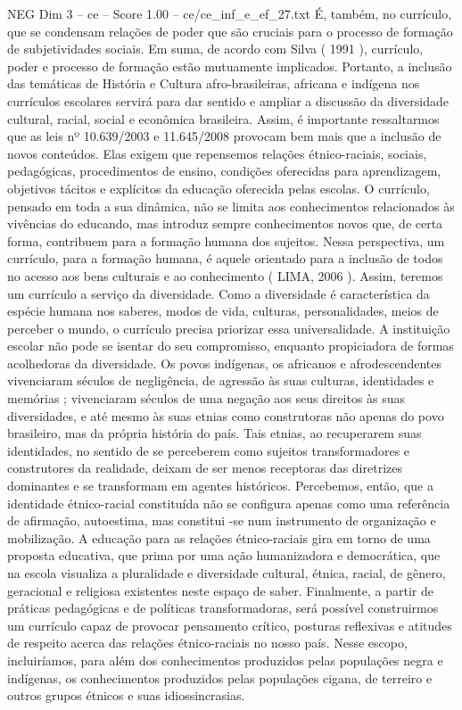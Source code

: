 \begin{textsample}{NEG Dim 3 – ce – Score 1.00 – ce/ce\_inf\_e\_ef\_27.txt}
É, também, no currículo, que se condensam relações de poder que são cruciais para o processo de formação de subjetividades sociais.
Em suma, de acordo com Silva ( 1991 ), currículo, poder e processo de formação estão mutuamente implicados.
Portanto, a inclusão das temáticas de História e Cultura afro-brasileiras, africana e indígena nos currículos escolares servirá para dar sentido e ampliar a discussão da diversidade cultural, racial, social e econômica brasileira.
Assim, é importante ressaltarmos que as leis nº 10.639/2003 e 11.645/2008 provocam bem mais que a inclusão de novos conteúdos.
Elas exigem que repensemos relações étnico-raciais, sociais, pedagógicas, procedimentos de ensino, condições oferecidas para aprendizagem, objetivos tácitos e explícitos da educação oferecida pelas escolas.
O currículo, pensado em toda a sua dinâmica, não se limita aos conhecimentos relacionados às vivências do educando, mas introduz sempre conhecimentos novos que, de certa forma, contribuem para a formação humana dos sujeitos.
Nessa perspectiva, um currículo, para a formação humana, é aquele orientado para a inclusão de todos no acesso aos bens culturais e ao conhecimento ( LIMA, 2006 ).
Assim, teremos um currículo a serviço da diversidade.
Como a diversidade é característica da espécie humana nos saberes, modos de vida, culturas, personalidades, meios de perceber o mundo, o currículo precisa priorizar essa universalidade.
A instituição escolar não pode se isentar do seu compromisso, enquanto propiciadora de formas acolhedoras da diversidade.
Os povos indígenas, os africanos e afrodescendentes vivenciaram séculos de negligência, de agressão às suas culturas, identidades e memórias ; vivenciaram séculos de uma negação aos seus direitos às suas diversidades, e até mesmo às suas etnias como construtoras não apenas do povo brasileiro, mas da própria história do país.
Tais etnias, ao recuperarem suas identidades, no sentido de se perceberem como sujeitos transformadores e construtores da realidade, deixam de ser menos receptoras das diretrizes dominantes e se transformam em agentes históricos.
Percebemos, então, que a identidade étnico-racial constituída não se configura apenas como uma referência de afirmação, autoestima, mas constitui -se num instrumento de organização e mobilização.
A educação para as relações étnico-raciais gira em torno de uma proposta educativa, que prima por uma ação humanizadora e democrática, que na escola visualiza a pluralidade e diversidade cultural, étnica, racial, de gênero, geracional e religiosa existentes neste espaço de saber.
Finalmente, a partir de práticas pedagógicas e de políticas transformadoras, será possível construirmos um currículo capaz de provocar pensamento crítico, posturas reflexivas e atitudes de respeito acerca das relações étnico-raciais no nosso país.
Nesse escopo, incluiríamos, para além dos conhecimentos produzidos pelas populações negra e indígenas, os conhecimentos produzidos pelas populações cigana, de terreiro e outros grupos étnicos e suas idiossincrasias.

\end{textsample}
